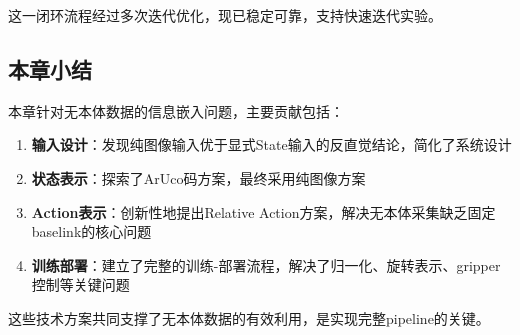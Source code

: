 这一闭环流程经过多次迭代优化，现已稳定可靠，支持快速迭代实验。

\subsection{本章小结}

本章针对无本体数据的信息嵌入问题，主要贡献包括：

\begin{enumerate}[leftmargin=2em]
    \item \textbf{输入设计}：发现纯图像输入优于显式State输入的反直觉结论，简化了系统设计
    \item \textbf{状态表示}：探索了ArUco码方案，最终采用纯图像方案
    \item \textbf{Action表示}：创新性地提出Relative Action方案，解决无本体采集缺乏固定baselink的核心问题
    \item \textbf{训练部署}：建立了完整的训练-部署流程，解决了归一化、旋转表示、gripper控制等关键问题
\end{enumerate}

这些技术方案共同支撑了无本体数据的有效利用，是实现完整pipeline的关键。

